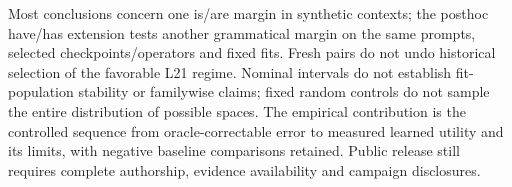 Most conclusions concern one is/are margin in synthetic contexts; the posthoc have/has extension tests another grammatical margin on the same prompts, selected checkpoints/operators and fixed fits. Fresh pairs do not undo historical selection of the favorable L21 regime. Nominal intervals do not establish fit-population stability or familywise claims; fixed random controls do not sample the entire distribution of possible spaces. The empirical contribution is the controlled sequence from oracle-correctable error to measured learned utility and its limits, with negative baseline comparisons retained. Public release still requires complete authorship, evidence availability and campaign disclosures.
